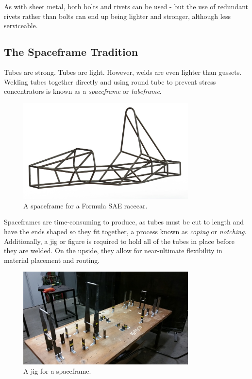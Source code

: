 \documentclass[10pt,letterpaper]{book}
\begin{document}
	As with sheet metal, both bolts and rivets can be used - but the use of redundant rivets rather than bolts can end up being lighter and stronger, although less serviceable.
	
	\subsection{The Spaceframe Tradition}
	Tubes are strong. Tubes are light. However, welds are even lighter than gussets. Welding tubes together directly and using round tube to prevent stress concentrators is known as a \textit{spaceframe} or \textit{tubeframe}.
	
	
	\begin{figure}[H]
		\includegraphics[width=0.8\textwidth]{imgs/tradition_tubeframe.jpeg}
		\caption{A spaceframe for a Formula SAE racecar.}
	\end{figure}
	
	Spaceframes are time-consuming to produce, as tubes must be cut to length and have the ends shaped so they fit together, a process known as \textit{coping} or \textit{notching}. Additionally, a jig or figure is required to hold all of the tubes in place before they are welded. On the upside, they allow for near-ultimate flexibility in material placement and routing.
	
	\begin{figure}[H]
		\includegraphics[width=0.8\textwidth]{imgs/tradition_tubeframe_jigging.jpeg}
		\caption{A jig for a spaceframe.}
	\end{figure}
	
\end{document}
